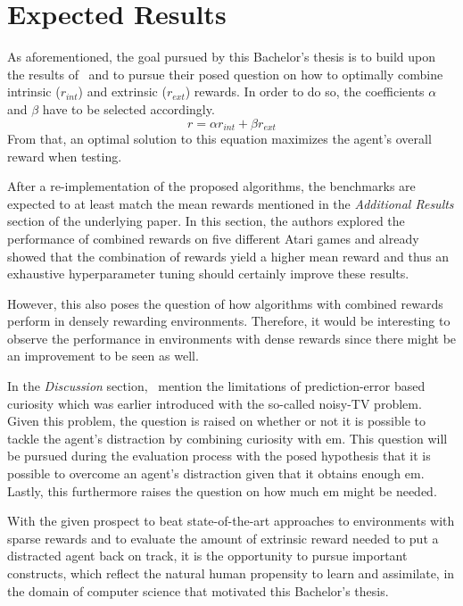 \documentclass[draft,final]{vutinfth} %
\begin{document}
    \section{Expected Results}\label{sec:expected-results}
    As aforementioned, the goal pursued by this Bachelor's thesis is to build upon the results of~\citet{burda_large-scale_2018-1} and to pursue their posed question on how to optimally combine intrinsic ($r_{int}$) and extrinsic ($r_{ext}$) rewards.
    In order to do so, the coefficients $\alpha$ and $\beta$ have to be selected accordingly.
    \[r=\alpha r_{int} + \beta r_{ext}\]
    From that, an optimal solution to this equation maximizes the agent's overall reward when testing.

    After a re-implementation of the proposed algorithms, the benchmarks are expected to at least match the mean rewards mentioned in the \textit{Additional Results} section of the underlying paper.
    In this section, the authors explored the performance of combined rewards on five different Atari games and already showed that the combination of rewards yield a higher mean reward and thus an exhaustive hyperparameter tuning should certainly improve these results.

    However, this also poses the question of how algorithms with combined rewards perform in densely rewarding environments.
    Therefore, it would be interesting to observe the performance in environments with dense rewards since there might be an improvement to be seen as well.

    In the \textit{Discussion} section,~\citet{burda_large-scale_2018-1} mention the limitations of prediction-error based curiosity which was earlier introduced with the so-called noisy-TV problem.
    Given this problem, the question is raised on whether or not it is possible to tackle the agent's distraction by combining curiosity with \gls{em}.
    This question will be pursued during the evaluation process with the posed hypothesis that it is possible to overcome an agent's distraction given that it obtains enough \gls{em}.
    Lastly, this furthermore raises the question on how much \gls{em} might be needed.

    With the given prospect to beat state-of-the-art approaches to environments with sparse rewards and to evaluate the amount of extrinsic reward needed to put a distracted agent back on track, it is the opportunity to pursue important constructs, which reflect the natural human propensity to learn and assimilate, in the domain of computer science that motivated this Bachelor's thesis.
\end{document}
